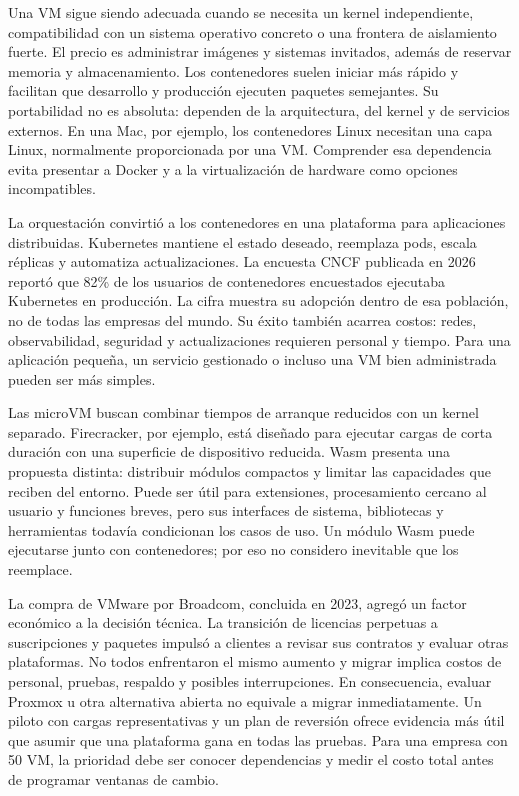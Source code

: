 Una VM sigue siendo adecuada cuando se necesita un kernel independiente, compatibilidad con un sistema operativo concreto o una frontera de aislamiento fuerte. El precio es administrar imágenes y sistemas invitados, además de reservar memoria y almacenamiento. Los contenedores suelen iniciar más rápido y facilitan que desarrollo y producción ejecuten paquetes semejantes. Su portabilidad no es absoluta: dependen de la arquitectura, del kernel y de servicios externos. En una Mac, por ejemplo, los contenedores Linux necesitan una capa Linux, normalmente proporcionada por una VM. Comprender esa dependencia evita presentar a Docker y a la virtualización de hardware como opciones incompatibles.

La orquestación convirtió a los contenedores en una plataforma para aplicaciones distribuidas. Kubernetes mantiene el estado deseado, reemplaza pods, escala réplicas y automatiza actualizaciones. La encuesta CNCF publicada en 2026 reportó que 82\% de los usuarios de contenedores encuestados ejecutaba Kubernetes en producción. La cifra muestra su adopción dentro de esa población, no de todas las empresas del mundo. Su éxito también acarrea costos: redes, observabilidad, seguridad y actualizaciones requieren personal y tiempo. Para una aplicación pequeña, un servicio gestionado o incluso una VM bien administrada pueden ser más simples.

Las microVM buscan combinar tiempos de arranque reducidos con un kernel separado. Firecracker, por ejemplo, está diseñado para ejecutar cargas de corta duración con una superficie de dispositivo reducida. Wasm presenta una propuesta distinta: distribuir módulos compactos y limitar las capacidades que reciben del entorno. Puede ser útil para extensiones, procesamiento cercano al usuario y funciones breves, pero sus interfaces de sistema, bibliotecas y herramientas todavía condicionan los casos de uso. Un módulo Wasm puede ejecutarse junto con contenedores; por eso no considero inevitable que los reemplace.

La compra de VMware por Broadcom, concluida en 2023, agregó un factor económico a la decisión técnica. La transición de licencias perpetuas a suscripciones y paquetes impulsó a clientes a revisar sus contratos y evaluar otras plataformas. No todos enfrentaron el mismo aumento y migrar implica costos de personal, pruebas, respaldo y posibles interrupciones. En consecuencia, evaluar Proxmox u otra alternativa abierta no equivale a migrar inmediatamente. Un piloto con cargas representativas y un plan de reversión ofrece evidencia más útil que asumir que una plataforma gana en todas las pruebas. Para una empresa con 50 VM, la prioridad debe ser conocer dependencias y medir el costo total antes de programar ventanas de cambio.


